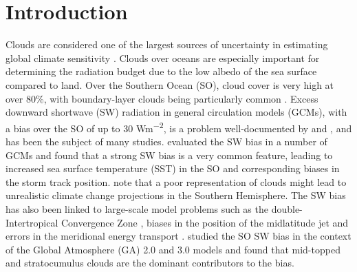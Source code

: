 \section{Introduction}

Clouds are considered one of the largest sources of uncertainty in estimating
global climate sensitivity \citep{boucher2013,flato2013,bony2015}. Clouds over
oceans are especially important for determining the radiation budget due to the
low albedo of the sea surface compared to land. Over the Southern Ocean (SO),
cloud cover is very high at over 80\%, with boundary-layer clouds being
particularly common \citep{mace2009}. Excess downward shortwave (SW) radiation
in general circulation models (GCMs), with a bias over the SO of up to 30
\unit{Wm^{-2}}, is a problem well-documented by \cite{trenberth2010} and
\cite{hyder2018}, and has been the subject of many studies.
\cite{bodas-salcedo2014} evaluated the SW bias in a number of GCMs and found
that a strong SW bias is a very common feature, leading to increased sea surface
temperature (SST) in the SO and corresponding biases in the storm track
position. \cite{trenberth2010} note that a poor representation of clouds might
lead to unrealistic climate change projections in the Southern Hemisphere. The
SW bias has also been linked to large-scale model problems such as the
double-Intertropical Convergence Zone \citep{hwang2013}, biases in the position
of the midlatitude jet \citep{ceppi2012} and errors in the meridional energy
transport \citep{mason2014}. \cite{bodas-salcedo2012} studied the SO SW bias in
the context of the Global Atmosphere (GA) 2.0 and 3.0 models and found that
mid-topped and stratocumulus clouds are the dominant contributors to the bias.

